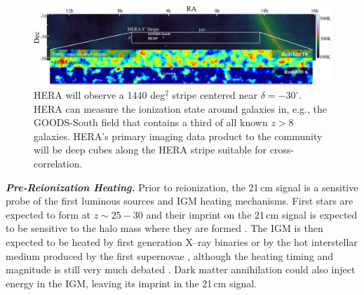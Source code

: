 \documentclass[preprint,11pt]{aastex}
\begin{document}

\begin{figure}[b!]
\centering
\vspace{-15pt}
    \includegraphics[width=1.0\textwidth,clip]{plots/HERA_FoV_w_strips.png}
  \vspace{-20pt}
\caption{\footnotesize 
HERA will observe a 1440 deg$^2$ stripe centered near $\delta = -30^\circ$. HERA can measure the ionization state around galaxies in, e.g., the GOODS-South field that contains a third of all known $z\!>\!8$ galaxies. HERA's primary imaging data product to the community will be deep cubes along the HERA stripe suitable for cross-correlation.
\label{fig:LSS} }
\vspace{-10pt}
\end{figure}

\emph{\textbf{Pre-Reionization Heating.}}
\label{sec:EoX} 
Prior to reionization, the 21\,cm signal is a sensitive probe of the first
luminous sources and IGM heating mechanisms. First stars are expected to form
at $z \sim 25-30$ and their imprint on the 21\,cm signal is expected to be
sensitive to the halo mass where they are formed \citep{mesinger_et_al2015}.
The IGM is then expected to be heated by first
generation X--ray binaries
\citep{furlanetto_et_al2006_global,pritchard_et_al2007,mesinger_et_al2013} or
by the hot interstellar medium produced by the first supernovae
\citep{pacucci_et_al2014}, although the heating timing and magnitude is still
very much debated \citep{fialkov_et_al2012}. Dark matter annihilation
\citep{evoli_et_al2014} could also inject energy in the IGM, leaving its
imprint in the 21\,cm signal.
 
\end{document}
